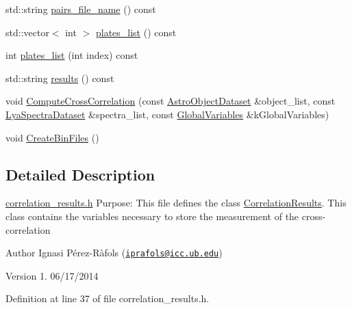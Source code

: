 \begin{DoxyCompactItemize}
\item 
std\-::string \hyperlink{class_correlation_results_a38ea35df21d881fa164a417cef678af4}{pairs\-\_\-file\-\_\-name} () const 
\item 
std\-::vector$<$ int $>$ \hyperlink{class_correlation_results_aea7eabb88af97738eaefb130217f5689}{plates\-\_\-list} () const 
\item 
int \hyperlink{class_correlation_results_a59a205c5ca406e92d229efbe24b8424c}{plates\-\_\-list} (int index) const 
\item 
std\-::string \hyperlink{class_correlation_results_ab6363e6a8c2357f6a432009e87b12abe}{results} () const 
\item 
void \hyperlink{class_correlation_results_ac70d1d7c6ab399bc97404903023023db}{Compute\-Cross\-Correlation} (const \hyperlink{class_astro_object_dataset}{Astro\-Object\-Dataset} \&object\-\_\-list, const \hyperlink{class_lya_spectra_dataset}{Lya\-Spectra\-Dataset} \&spectra\-\_\-list, const \hyperlink{class_global_variables}{Global\-Variables} \&k\-Global\-Variables)
\item 
void \hyperlink{class_correlation_results_afd279057c1c250889bb4c462ad43fd52}{Create\-Bin\-Files} ()
\end{DoxyCompactItemize}


\subsection{Detailed Description}
\hyperlink{correlation__results_8h}{correlation\-\_\-results.\-h} Purpose\-: This file defines the class \hyperlink{class_correlation_results}{Correlation\-Results}. This class contains the variables necessary to store the measurement of the cross-\/correlation

\begin{DoxyAuthor}{Author}
Ignasi Pérez-\/\-Ràfols (\href{mailto:iprafols@icc.ub.edu}{\tt iprafols@icc.\-ub.\-edu}) 
\end{DoxyAuthor}
\begin{DoxyVersion}{Version}
1. 06/17/2014 
\end{DoxyVersion}


Definition at line 37 of file correlation\-\_\-results.\-h.



